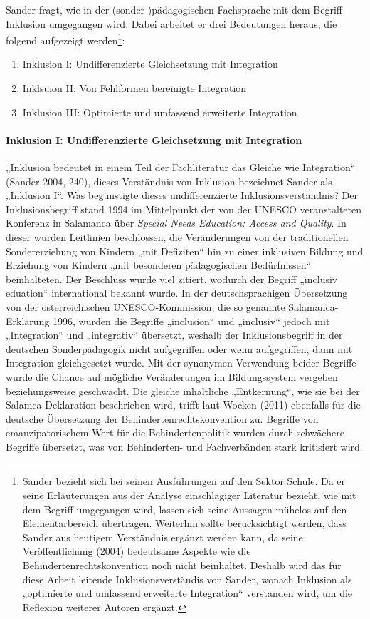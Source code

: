 Sander fragt, wie in der (sonder-)pädagogischen Fachsprache mit dem Begriff Inklusion umgegangen wird. Dabei arbeitet er drei Bedeutungen heraus, die folgend aufgezeigt werden\footnote{Sander bezieht sich bei seinen Ausführungen auf den Sektor Schule. Da er seine Erläuterungen aus der Analyse einschlägiger Literatur bezieht, wie mit dem Begriff umgegangen wird, lassen sich seine Aussagen mühelos auf den Elementarbereich übertragen.
Weiterhin sollte berücksichtigt werden, dass Sander aus heutigem Verständnis ergänzt werden kann, da seine Veröffentlichung (2004) bedeutsame Aspekte wie die Behindertenrechtskonvention noch nicht beinhaltet. Deshalb wird das für diese Arbeit leitende Inklusionsverständis von Sander, wonach Inklusion als „optimierte und umfassend erweiterte Integration“ verstanden wird, um die Reflexion weiterer Autoren ergänzt.}: 
\begin{enumerate}
\item Inklusion I: Undifferenzierte Gleichsetzung mit Integration
\item Inklsuion II: Von Fehlformen bereinigte Integration
\item Inklusion III: Optimierte und umfassend erweiterte Integration
\end{enumerate}  
  
\paragraph{Inklusion I: Undifferenzierte Gleichsetzung mit Integration}
„Inklusion bedeutet in einem Teil der Fachliteratur das Gleiche wie Integration“ (Sander 2004, 240), dieses Verständnis von Inklusion bezeichnet Sander als „Inklusion I“. 
Was begünstigte dieses undifferenzierte Inklusionsverständnis? 
Der Inklusionsbegriff stand 1994 im Mittelpunkt der von der UNESCO veranstalteten Konferenz in Salamanca über \emph{Special Needs Education: Access and Quality}. In dieser wurden Leitlinien beschlossen, die Veränderungen von der traditionellen Sondererziehung von Kindern „mit Defiziten“ hin zu einer inklusiven Bildung und Erziehung von Kindern „mit besonderen pädagogischen Bedürfnissen“ beinhalteten. Der Beschluss wurde viel zitiert, wodurch der Begriff „inclusiv eduation“ international bekannt wurde. 
In der deutschsprachigen Übersetzung von der österreichischen UNESCO-Kommission, die so genannte Salamanca-Erklärung 1996, wurden die Begriffe „inclusion“ und „inclusiv“ jedoch mit „Integration“ und „integrativ“ übersetzt, weshalb der Inklusionsbegriff in der deutschen Sonderpädagogik nicht aufgegriffen oder wenn aufgegriffen, dann mit Integration gleichgesetzt wurde. Mit der synonymen Verwendung beider Begriffe wurde die Chance auf mögliche Veränderungen im Bildungssystem vergeben beziehungsweise geschwächt. Die gleiche inhaltliche „Entkernung“, wie sie bei der Salamca Deklaration beschrieben wird, trifft laut Wocken (2011) ebenfalls für die deutsche Übersetzung der Behindertenrechtskonvention zu. Begriffe von emanzipatorischem Wert für die Behindertenpolitik wurden durch schwächere Begriffe übersetzt, was von Behinderten- und Fachverbänden stark kritisiert wird.
  
